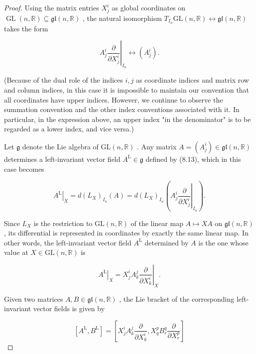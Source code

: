 \begin{proof}
\leanok
Using the matrix entries ${X}_{j}^{i}$ as global coordinates on $\operatorname{GL}\left( {n,\mathbb{R}}\right)  \subseteq  \mathfrak{{gl}}\left( {n,\mathbb{R}}\right)$ , the natural isomorphism ${T}_{{I}_{n}}\mathrm{{GL}}\left( {n,\mathbb{R}}\right)  \leftrightarrow  \mathfrak{{gl}}\left( {n,\mathbb{R}}\right)$ takes the form

\[
{\left. {A}_{j}^{i}\frac{\partial }{\partial {X}_{j}^{i}}\right| }_{{I}_{n}} \leftrightarrow  \left( {A}_{j}^{i}\right) .
\]

(Because of the dual role of the indices $i, j$ as coordinate indices and matrix row and column indices, in this case it is impossible to maintain our convention that all coordinates have upper indices. However, we continue to observe the summation convention and the other index conventions associated with it. In particular, in the expression above, an upper index "in the denominator" is to be regarded as a lower index, and vice versa.)

Let $\mathfrak{g}$ denote the Lie algebra of $\mathrm{{GL}}\left( {n,\mathbb{R}}\right)$ . Any matrix $A = \left( {A}_{j}^{i}\right)  \in  \mathfrak{{gl}}\left( {n,\mathbb{R}}\right)$ determines a left-invariant vector field ${A}^{\mathrm{L}} \in  \mathfrak{g}$ defined by (8.13), which in this case becomes

\[
{\left. {A}^{\mathrm{L}}\right| }_{X} = d{\left( {L}_{X}\right) }_{{I}_{n}}\left( A\right)  = d{\left( {L}_{X}\right) }_{{I}_{n}}\left( {\left. {A}_{j}^{i}\frac{\partial }{\partial {X}_{j}^{i}}\right| }_{{I}_{n}}\right) .
\]

Since ${L}_{X}$ is the restriction to $\mathrm{{GL}}\left( {n,\mathbb{R}}\right)$ of the linear map $A \mapsto  {XA}$ on $\mathfrak{{gl}}\left( {n,\mathbb{R}}\right)$ , its differential is represented in coordinates by exactly the same linear map. In other words, the left-invariant vector field ${A}^{\mathrm{L}}$ determined by $A$ is the one whose value at $X \in  \mathrm{{GL}}\left( {n,\mathbb{R}}\right)$ is

\[
{\left. {A}^{\mathrm{L}}\right| }_{X} = {\left. {X}_{j}^{i}{A}_{k}^{j}\frac{\partial }{\partial {X}_{k}^{i}}\right| }_{X}. \tag{8.15}
\]

Given two matrices $A, B \in  \mathfrak{{gl}}\left( {n,\mathbb{R}}\right)$ , the Lie bracket of the corresponding left-invariant vector fields is given by

\[
\left\lbrack  {{A}^{\mathrm{L}},{B}^{\mathrm{L}}}\right\rbrack   = \left\lbrack  {{X}_{j}^{i}{A}_{k}^{j}\frac{\partial }{\partial {X}_{k}^{i}},{X}_{q}^{p}{B}_{r}^{q}\frac{\partial }{\partial {X}_{r}^{p}}}\right\rbrack
\]


\end{proof}
